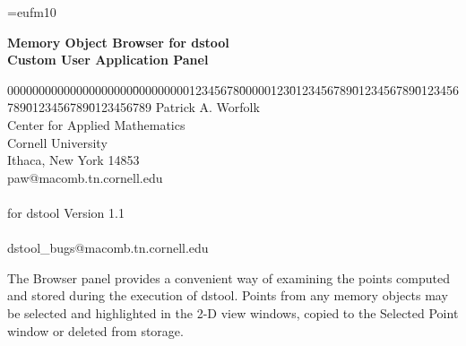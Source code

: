 


\oddsidemargin 0.25in
\topmargin 0.25in
\headheight 0.25in

\textwidth 6in 
\headsep 0in
\textheight 8.25in

\font\setfont=eufm10




\begin{center}
{\LARGE \bf Memory Object Browser for dstool}  \\
\vspace{.15in}
{\large \bf Custom User Application Panel}
\end{center}

\vspace{.2in}
\begin{tabbing}
00000000000000000000\=00000000012345678\=00000123\=0123456789\=0123456789\=0123456789\=0123456789\=0123456789 \kill
{} \> Patrick A. Worfolk \\
\>	       \> Center for Applied Mathematics  \\
\>	       \> Cornell University \\
\>	       \> Ithaca, New York \hspace{.1in}  14853 \\
\>	       \> paw@macomb.tn.cornell.edu \\
\>	       \>   \\
 \hspace{.07in} for dstool Version 1.1   \\
\>	       \>   \\
 \> dstool\_bugs@macomb.tn.cornell.edu
\end{tabbing}
\vspace{.2in}


  The Browser panel provides a convenient way of
	examining the points computed and stored during the execution of
	dstool.  Points from any memory objects may be selected and highlighted
	in the 2-D view windows, copied to the Selected Point window or deleted
	from storage.

\vspace{.15in}

